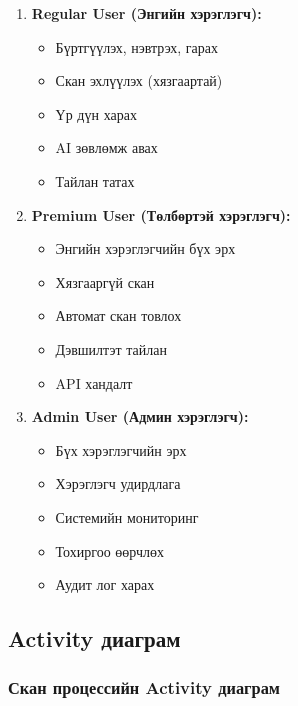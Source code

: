 \documentclass[main.tex]{subfiles}
\begin{document}
\begin{enumerate}
    \item \textbf{Regular User (Энгийн хэрэглэгч):}
    \begin{itemize}
        \item Бүртгүүлэх, нэвтрэх, гарах
        \item Скан эхлүүлэх (хязгаартай)
        \item Үр дүн харах
        \item AI зөвлөмж авах
        \item Тайлан татах
    \end{itemize}
    
    \item \textbf{Premium User (Төлбөртэй хэрэглэгч):}
    \begin{itemize}
        \item Энгийн хэрэглэгчийн бүх эрх
        \item Хязгааргүй скан
        \item Автомат скан товлох
        \item Дэвшилтэт тайлан
        \item API хандалт
    \end{itemize}
    
    \item \textbf{Admin User (Админ хэрэглэгч):}
    \begin{itemize}
        \item Бүх хэрэглэгчийн эрх
        \item Хэрэглэгч удирдлага
        \item Системийн мониторинг
        \item Тохиргоо өөрчлөх
        \item Аудит лог харах
    \end{itemize}
\end{enumerate}

\subsection{Activity диаграм}

\subsubsection{Скан процессийн Activity диаграм}
\end{document}

